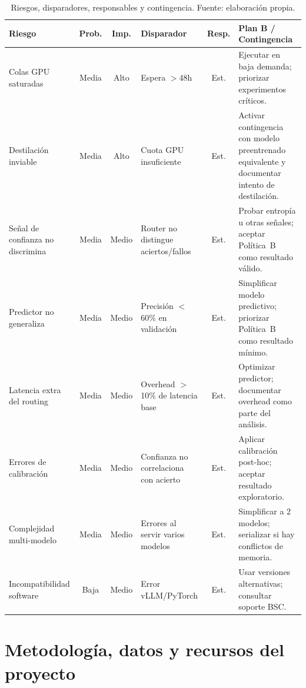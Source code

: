 \begin{table}[H]
\centering
\caption{Riesgos, disparadores, responsables y contingencia. Fuente: elaboración propia.}
\label{tab:risks}
\scriptsize
\setlength{\tabcolsep}{2pt}
\begin{tabularx}{\textwidth}{>{\raggedright\arraybackslash}p{2cm} c c >{\raggedright\arraybackslash}p{2.2cm} c >{\raggedright\arraybackslash}X}
\toprule
\textbf{Riesgo} & \textbf{Prob.} & \textbf{Imp.} & \textbf{Disparador} & \textbf{Resp.} & \textbf{Plan B / Contingencia} \\
\midrule
Colas GPU saturadas & Media & Alto & Espera $>$48h & Est. & Ejecutar en baja demanda; priorizar experimentos críticos. \\
\addlinespace
Destilación inviable & Media & Alto & Cuota GPU insuficiente & Est. & Activar contingencia con modelo preentrenado equivalente y documentar intento de destilación. \\
\addlinespace
Señal de confianza no discrimina & Media & Medio & Router no distingue aciertos/fallos & Est. & Probar entropía u otras señales; aceptar Política~B como resultado válido. \\
\addlinespace
Predictor no generaliza & Media & Medio & Precisión $<$60\% en validación & Est. & Simplificar modelo predictivo; priorizar Política~B como resultado mínimo. \\
\addlinespace
Latencia extra del routing & Media & Medio & Overhead $>$10\% de latencia base & Est. & Optimizar predictor; documentar overhead como parte del análisis. \\
\addlinespace
Errores de calibración & Media & Medio & Confianza no correlaciona con acierto & Est. & Aplicar calibración post-hoc; aceptar resultado exploratorio. \\
\addlinespace
Complejidad multi-modelo & Media & Medio & Errores al servir varios modelos & Est. & Simplificar a 2 modelos; serializar si hay conflictos de memoria. \\
\addlinespace
Incompatibilidad software & Baja & Medio & Error vLLM/PyTorch & Est. & Usar versiones alternativas; consultar soporte BSC. \\
\bottomrule
\end{tabularx}
\end{table}

\section{Metodología, datos y recursos del proyecto}
\label{sec:metodologia-trabajo}

